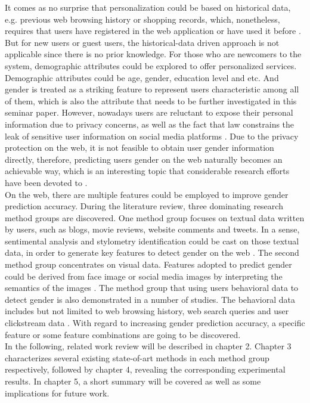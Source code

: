 \documentclass[runningheads]{llncs}
\begin{document}
	It comes as no surprise that personalization could be based on historical data, e.g. previous web browsing history or shopping records, which, nonetheless, requires that users have registered in the web application or have used it before \cite{duong2016customer}. But for new users or guest users, the historical-data driven approach is not applicable since there is no prior knowledge. For those who are newcomers to the system, demographic attributes could be explored to offer personalized services. Demographic attributes could be age, gender, education level and etc. And gender is treated as a striking feature to represent user\textquotesingle s characteristic among all of them, which is also the attribute that needs to be further investigated in this seminar paper. However, nowadays users are reluctant to expose their personal information due to privacy concerns, as well as the fact that law constrains the leak of sensitive user information on social media platforms \cite{zheleva2009join}. Due to the privacy protection on the web, it is not feasible to obtain user gender information directly, therefore, predicting user\textquotesingle s gender on the web naturally becomes an achievable way, which is an interesting topic that considerable research efforts have been devoted to \cite{phuong2014gender}. \\
	
	On the web, there are multiple features could be employed to improve gender prediction accuracy. During the literature review, three dominating research method groups are discovered. One method group focuses on textual data written by users, such as blogs, movie reviews, website comments and tweets. In a sense, sentimental analysis and stylometry identification could be cast on those textual data, in order to generate key features to detect gender on the web \cite{phuong2014gender}. The second method group concentrates on visual data. Features adopted to predict gender could be derived from face image or social media images by interpreting the semantics of the images \cite{merler2015you}. The method group that using user\textquotesingle s behavioral data to detect gender is also demonstrated in a number of studies. The behavioral data includes but not limited to web browsing history, web search queries and user clickstream data \cite{hu2007demographic}. With regard to increasing gender prediction accuracy, a specific feature or some feature combinations are going to be discovered. \\
	
	In the following, related work review will be described in chapter 2. Chapter 3 characterizes several existing state-of-art methods in each method group respectively, followed by chapter 4, revealing the corresponding experimental results. In chapter 5, a short summary will be covered as well as some implications for future work. 
	
\end{document}
